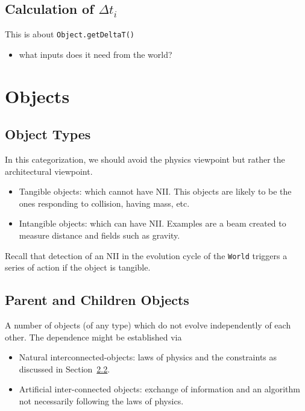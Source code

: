 \documentclass[a4paper]{report}
\begin{document}
\section{Calculation of $\Delta t_i$}
This is about \verb+Object.getDeltaT()+

\begin{itemize}
\item what inputs does it need from the world?
\end{itemize}

\chapter{Objects}
\section{Object Types}
In this categorization, we should avoid the physics viewpoint but rather the architectural viewpoint. 
\begin{itemize}
	\item Tangible objects: which cannot have NII. This objects are likely to be the ones responding to collision, having mass, etc.
	\item Intangible objects: which can have NII. Examples are a beam created to measure distance and fields such as gravity.
\end{itemize}

Recall that detection of an NII in the evolution cycle of the \verb+World+ triggers a series of action if the object is tangible.

\section{Parent and Children Objects}
A number of objects (of any type) which do not evolve independently of each other. The dependence might be established via 
\begin{itemize}
	\item Natural interconnected-objects: laws of physics and the constraints as discussed in Section~\ref{}. 
	\item Artificial inter-connected objects: exchange of information and an algorithm not necessarily following the laws of physics. 
\end{itemize}
\end{document}

